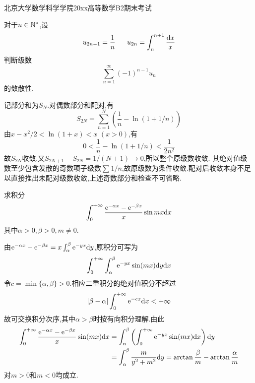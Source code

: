 \documentclass{ctexart}
\begin{document}
\pagestyle{empty}
\begin{center}\Large
    北京大学数学科学学院20xx高等数学B2期末考试
\end{center}
\begin{problem}[1.(10\songti{分})]
对于$n\in\mathbb{N}^*$,设
        \[u_{2n-1}=\dfrac1n\ \ \ \ \ u_{2n}=\int_n^{n+1}\dfrac{\di x}{x}\]
        判断级数
        \[\sum_{n=1}^{\infty}(-1)^{n-1}u_n\]
        的敛散性.
\end{problem}
\begin{solution}
记部分和为$S_N$.对偶数部分和配对,有
\[S_{2N}=\sum_{n=1}^N\left(\frac1n-\ln(1+1/n)\right)\]
由$x-x^2/2<\ln(1+x)<x$ $(x>0)$,有
\[0<\frac1n-\ln(1+1/n)<\frac1{2n^2}\]
故$S_{2N}$收敛.又$S_{2N+1}-S_{2N}=1/(N+1)\to0$,所以整个原级数收敛.
其绝对值级数至少包含发散的奇数项子级数$\sum1/n$,故原级数为条件收敛.配对后收敛本身不足以直接推出未配对级数收敛,上述奇数部分和检查不可省略.
\end{solution}

\begin{problem}[2.(10\songti{分})]
求积分
        \[\int_0^{+\infty}\dfrac{\mathrm{e}^{-\alpha x}-\mathrm{e}^{-\beta x}}{x}\sin mx\mathrm{d} x\]
        其中$\alpha>0,\beta>0,m\neq0$.
\end{problem}
\begin{solution}
由$\mathrm{e}^{-\alpha x}-\mathrm{e}^{-\beta x}=x\int_\alpha^\beta\mathrm{e}^{-yx}\mathrm{d} y$,原积分可写为
\[\int_0^{+\infty}\int_\alpha^\beta\mathrm{e}^{-yx}\sin(mx)\mathrm{d} y\mathrm{d} x\]
令$c=\min\{\alpha,\beta\}>0$.相应二重积分的绝对值积分不超过
\[|\beta-\alpha|\int_0^{+\infty}\mathrm{e}^{-cx}\mathrm{d} x<+\infty\]
故可交换积分次序,其中$\alpha>\beta$时按有向积分理解.由此
\[\begin{aligned}
\int_0^{+\infty}\frac{\mathrm{e}^{-\alpha x}-\mathrm{e}^{-\beta x}}x\sin(mx)\mathrm{d} x
&=\int_\alpha^\beta\left(\int_0^{+\infty}\mathrm{e}^{-yx}\sin(mx)\mathrm{d} x\right)\mathrm{d} y\\
&=\int_\alpha^\beta\frac{m}{y^2+m^2}\mathrm{d} y
=\arctan\frac\beta m-\arctan\frac\alpha m
\end{aligned}\]
对$m>0$和$m<0$均成立.
\end{solution}
\end{document}

